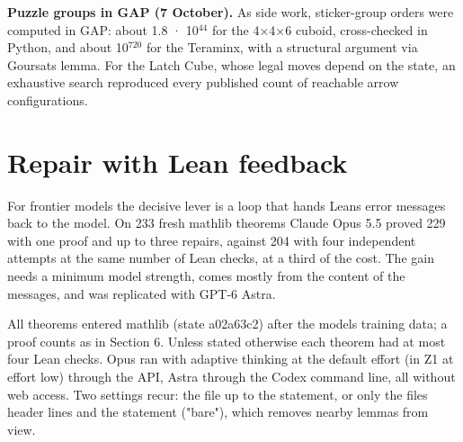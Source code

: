 \documentclass[11pt,a4paper]{article}
\begin{document}
\textbf{Puzzle groups in GAP (7 October).} As side work, sticker-group orders were computed in GAP: about 1.8 · 10\(^{44}\) for the 4×4×6 cuboid, cross-checked in Python, and about 10\(^{720}\) for the Teraminx, with a structural argument via Goursat\textquotesingle s lemma. For the Latch Cube, whose legal moves depend on the state, an exhaustive search reproduced every published count of reachable arrow configurations.

\section{Repair with Lean feedback}

For frontier models the decisive lever is a loop that hands Lean\textquotesingle s error messages back to the model. On 233 fresh mathlib theorems Claude Opus 5.5 proved 229 with one proof and up to three repairs, against 204 with four independent attempts at the same number of Lean checks, at a third of the cost. The gain needs a minimum model strength, comes mostly from the content of the messages, and was replicated with GPT-6 Astra.

All theorems entered mathlib (state a02a63c2) after the models\textquotesingle{} training data; a proof counts as in Section 6. Unless stated otherwise each theorem had at most four Lean checks. Opus ran with adaptive thinking at the default effort (in Z1 at effort low) through the API, Astra through the Codex command line, all without web access. Two settings recur: the file up to the statement, or only the file\textquotesingle s header lines and the statement ("bare"), which removes nearby lemmas from view.
\end{document}
